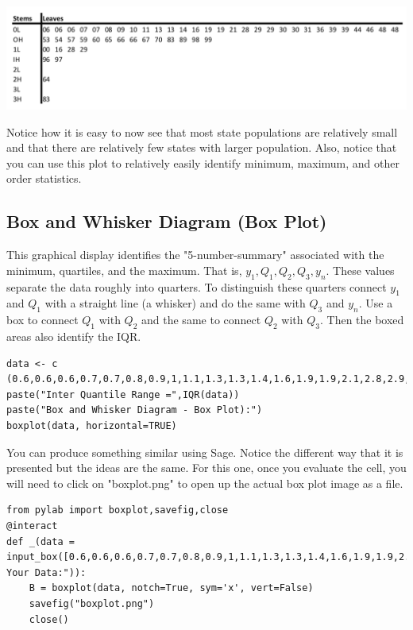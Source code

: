 \documentclass[10pt,]{book}
\theoremstyle{plain}
\theoremstyle{definition}
\theoremstyle{definition}
\theoremstyle{definition}
\numberwithin{equation}{section}
\begin{document}
	
\includegraphics[width=1\linewidth]{images/stemandleaf.png}


Notice how it is easy to now see that most state populations are relatively small and that there are relatively few states with larger population. Also, notice that you can use this plot to relatively easily identify minimum, maximum, and other order statistics.		
%
\typeout{************************************************}
\typeout{************************************************}
\subsection[{Box and Whisker Diagram (Box Plot)}]{Box and Whisker Diagram (Box Plot)}\label{subsection-5}
This graphical display identifies the "5-number-summary" associated with the minimum, quartiles, and the maximum. That is, \(y_1, Q_1, Q_2, Q_3, y_n\).  These values separate the data roughly into quarters. To distinguish these quarters connect \(y_1\) and \(Q_1\) with a straight line (a whisker) and do the same with \(Q_3\) and \(y_n\). Use a box to connect \(Q_1\) with \(Q_2\) and the same to connect \(Q_2\) with \(Q_3\). Then the boxed areas also identify the IQR.  
%
\begin{lstlisting}[style=sageinput]
data <- c (0.6,0.6,0.6,0.7,0.7,0.8,0.9,1,1.1,1.3,1.3,1.4,1.6,1.9,1.9,2.1,2.8,2.9,2.9,3,3,3.1,3.6,3.9,3.9,4.4,4.6,4.8,4.8,5.3,5.4,5.7,5.9,6,6.5,6.6,6.6,6.7,7,8.3,8.9,9.8,9.9,10,11.6,12.8,12.9,19.6,19.7,26.4,38.3)
paste("Inter Quantile Range =",IQR(data))
paste("Box and Whisker Diagram - Box Plot):")
boxplot(data, horizontal=TRUE)
\end{lstlisting}
\par

You can produce something similar using Sage. Notice the different way that it is presented but the ideas are the same. For this one, once you evaluate the cell, you will need to click on "boxplot.png" to open up the actual box plot image as a file.
%
\begin{lstlisting}[style=sageinput]
from pylab import boxplot,savefig,close
@interact
def _(data = input_box([0.6,0.6,0.6,0.7,0.7,0.8,0.9,1,1.1,1.3,1.3,1.4,1.6,1.9,1.9,2.1,2.8,2.9,2.9,3,3,3.1,3.6,3.9,3.9,4.4,4.6,4.8,4.8,5.3,5.4,5.7,5.9,6,6.5,6.6,6.6,6.7,7,8.3,8.9,9.8,9.9,10,11.6,12.8,12.9,19.6,19.7,26.4,38.3],label="Enter Your Data:")):
    B = boxplot(data, notch=True, sym='x', vert=False)
    savefig("boxplot.png")
    close()
\end{lstlisting}
\typeout{************************************************}
\typeout{************************************************}
\end{document}
